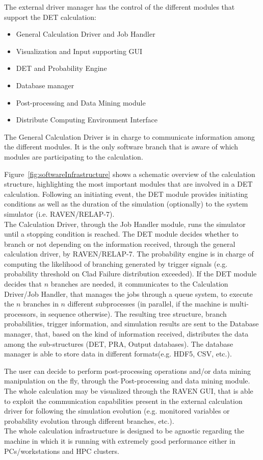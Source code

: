 The external driver manager has the control of the different modules that support the DET calculation:
\vspace{-5mm}
\begin{itemize}
\itemsep0em
\item General Calculation Driver and Job Handler
\item Visualization and Input supporting GUI
\item DET and Probability Engine
\item Database manager
\item Post-processing and Data Mining module
\item Distribute Computing Environment Interface
\end{itemize}
\vspace{-5mm}
The General Calculation Driver is in charge to communicate information among the different modules. It is the only software branch that is aware of which modules are participating to the calculation.   

Figure~\ref{fig:softwareInfrastructure} shows a schematic overview of the calculation structure, highlighting the most important modules that are involved in a DET calculation. Following an initiating event, the DET module provides initiating conditions as well as the duration of the simulation (optionally) to the system simulator (i.e. RAVEN/RELAP-7). 
\\The Calculation Driver, through the Job Handler module, runs the simulator until a stopping condition is reached. The DET module decides whether to branch or not depending on the information received, through the general calculation driver, by RAVEN/RELAP-7. 
The probability engine is in charge of computing the likelihood of branching generated by trigger signals (e.g. probability threshold on Clad Failure distribution exceeded).  If the DET module decides that $n$ branches are needed, it communicates to the Calculation Driver/Job Handler, that manages the jobs through a queue system, to execute the $n$ branches in $n$ different subprocesses (in parallel, if the machine is multi-processors, in sequence otherwise). The resulting tree structure, branch probabilities, trigger information, and simulation results are sent to the Database manager, that, based on the kind of information received, distributes the data among the sub-structures (DET, PRA, Output databases). The database manager is able to store data in different formats(e.g. HDF5, CSV, etc.). 

The user can decide to perform post-processing operations and/or data mining manipulation on the fly, through the Post-processing and data mining module. The whole calculation may be visualized through the RAVEN GUI, that is able to exploit the communication capabilities present in the external calculation driver for following the simulation evolution (e.g. monitored variables or probability evolution through different branches, etc.). \\ The whole calculation infrastructure is designed to be agnostic regarding the machine in which it is running with extremely good performance either in PCs/workstations and HPC clusters. 
